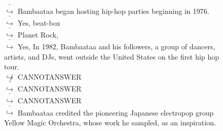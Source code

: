 \documentclass[11pt,a4paper, onecolumn]{article}
\begin{document}
\begin{figure}[t] \small \begin{tcolorbox}[boxsep=0pt,left=5pt,right=0pt,top=2pt,colback = yellow!5] \begin{dialogue}
 \small 
\colorbox{pink!25}{ $\bar{\hookrightarrow}$}
{ Bambaataa began hosting hip-hop parties beginning in 1976. }
\\
\colorbox{pink!25}{ $\bar{\hookrightarrow}$}
\colorbox{red!25}{Yes,}
{ beat-box }
\\
\colorbox{pink!25}{ $\bar{\hookrightarrow}$}
{ Planet Rock, }
\\
\colorbox{pink!25}{ $\bar{\hookrightarrow}$}
\colorbox{red!25}{Yes,}
{ In 1982, Bambaataa and his followers, a group of dancers, artists, and DJs, went outside the United States on the first hip hop tour. }
\\
\colorbox{pink!25}{$\not\hookrightarrow$}
{ CANNOTANSWER }
\\
\colorbox{pink!25}{ $\bar{\hookrightarrow}$}
{ CANNOTANSWER }
\\
\colorbox{pink!25}{ $\bar{\hookrightarrow}$}
{ CANNOTANSWER }
\\
\colorbox{pink!25}{ $\bar{\hookrightarrow}$}
{ Bambaataa credited the pioneering Japanese electropop group Yellow Magic Orchestra, whose work he sampled, as an inspiration. }
 \end{dialogue}\end{tcolorbox}\end{figure}
\end{document}
